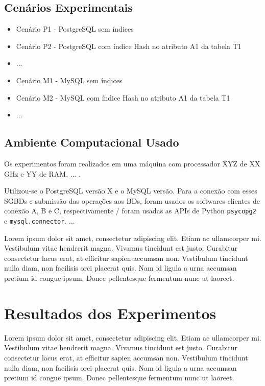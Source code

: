 \documentclass[12pt,a4paper]{article}
\begin{document}
\subsection{Cenários Experimentais}
\begin{itemize}
    \item Cenário P1 - PostgreSQL sem índices
    \item Cenário P2 - PostgreSQL com índice Hash no atributo A1 da tabela T1
    \item ...
    \item Cenário M1 - MySQL sem índices
    \item Cenário M2 - MySQL com índice Hash no atributo A1 da tabela T1
    \item ...
\end{itemize}

\subsection{Ambiente Computacional Usado}
Os experimentos foram realizados em uma máquina com processador XYZ de XX GHz e YY de RAM, ... .

Utilizou-se o PostgreSQL versão X e o MySQL versão. Para a conexão com esses SGBDs e submissão das operações aos BDs, foram usados os softwares clientes de conexão A, B e C, respectivamente / foram usadas as APIs de Python \texttt{psycopg2} e \texttt{mysql.connector}. ...

Lorem ipsum dolor sit amet, consectetur adipiscing elit. Etiam ac ullamcorper mi. Vestibulum vitae hendrerit magna. Vivamus tincidunt est justo. Curabitur consectetur lacus erat, at efficitur sapien accumsan non. Vestibulum tincidunt nulla diam, non facilisis orci placerat quis. Nam id ligula a urna accumsan pretium id congue ipsum. Donec pellentesque fermentum nunc ut laoreet.

\section{Resultados dos Experimentos}
Lorem ipsum dolor sit amet, consectetur adipiscing elit. Etiam ac ullamcorper mi. Vestibulum vitae hendrerit magna. Vivamus tincidunt est justo. Curabitur consectetur lacus erat, at efficitur sapien accumsan non. Vestibulum tincidunt nulla diam, non facilisis orci placerat quis. Nam id ligula a urna accumsan pretium id congue ipsum. Donec pellentesque fermentum nunc ut laoreet.
\end{document}
